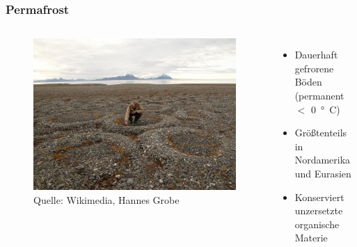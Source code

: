 \begin{frame}
	\frametitle{Permafrost}
  \begin{columns}
    \begin{figure}
      \centering
      \includegraphics[trim=0 0 0.66\imagewidth{} 0, clip, width = 0.8\linewidth]{bilder/Permafrost_stone-rings_hg.jpg}
      \caption{Quelle: Wikimedia, Hannes Grobe}
    \end{figure}
	\begin{itemize}
		\item Dauerhaft gefrorene Böden (permanent $<$ \SI{0}{°C})
		\item Größtenteils in Nordamerika und Eurasien
		\item Konserviert unzersetzte organische Materie

\end{itemize}
\end{columns}
\end{frame}
